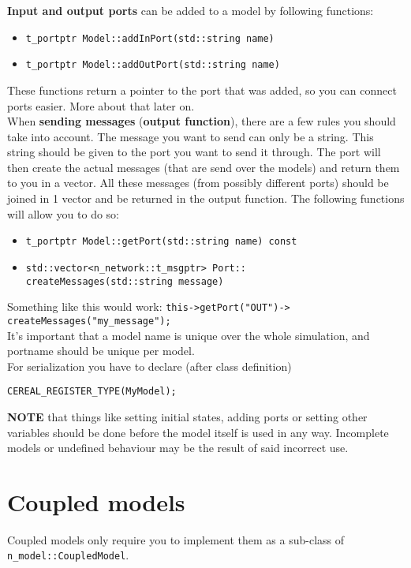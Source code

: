 \textbf{Input and output ports} can be added to a model by following functions:
\begin{itemize}
	\item \texttt{t\_portptr Model::addInPort(std::string name)}
	\item \texttt{t\_portptr Model::addOutPort(std::string name)}
\end{itemize}
These functions return a pointer to the port that was added, so you can connect ports easier. More about that later on. \\

When \textbf{sending messages} (\textbf{output function}), there are a few rules you should take into account. The message you want to send can only be a string. This string should be given to the port you want to send it through. The port will then create the actual messages (that are send over the models) and return them to you in a vector. All these messages (from possibly different ports) should be joined in 1 vector and be returned in the output function. The following functions will allow you to do so:
\begin{itemize}
	\item \texttt{t\_portptr Model::getPort(std::string name) const}
	\item \texttt{std::vector{\textless}n\_network::t\_msgptr{\textgreater} Port:: \\createMessages(std::string message)}
\end{itemize} 
Something like this would work: \texttt{this-{\textgreater}getPort("OUT")-{\textgreater} \\createMessages("my\_message");} \\

It's important that a model name is unique over the whole simulation, and portname should be unique per model.\\

For serialization you have to declare (after class definition)
\begin{verbatim}
CEREAL_REGISTER_TYPE(MyModel);
\end{verbatim}

\textbf{NOTE} that things like setting initial states, adding ports or setting other variables should be done before the model itself is used in any way. Incomplete models or undefined behaviour may be the result of said incorrect use.

\section{Coupled models}
Coupled models only require you to implement them as a sub-class of \\ \texttt{n\_model::CoupledModel}.


